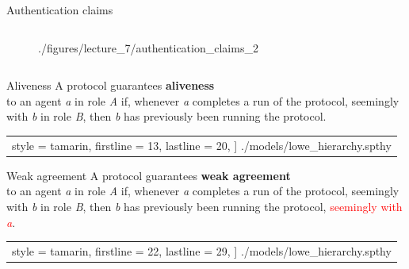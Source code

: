 \documentclass[11pt,aspectratio=169]{beamer}
\begin{document}
\begin{frame}[fragile]{Authentication claims}
\begin{columns}[T]
\begin{column}{.35\textwidth}
\begin{figure}
                    {./figures/lecture_7/authentication_claims_2}
            \end{figure}
        \end{column}
    \end{columns}
\end{frame}

\begin{frame}[fragile,t]{Aliveness}
    A protocol guarantees \textbf{aliveness}\\ to an agent \textit{a} in role 
    \textit{A} if, whenever \textit{a} completes a run of the protocol, 
    seemingly with \textit{b} in role \textit{B}, then \textit{b} has 
    previously been running the protocol.
    \vfill
    \begin{center}
        \begin{tabular}{c}
            
                style = tamarin,
                firstline = 13,
                lastline  = 20,
            ] {./models/lowe_hierarchy.spthy}
        \end{tabular}
    \end{center}
\end{frame}

\begin{frame}[fragile,t]{Weak agreement}
    A protocol guarantees \textbf{weak agreement}\\ to an agent \textit{a} in 
    role \textit{A} if, whenever \textit{a} completes a run of the protocol, 
    seemingly with \textit{b} in role \textit{B}, then \textit{b} has 
    previously been running the protocol, \textcolor{red}{seemingly with
    \textit{a}}.
    \vfill
    \begin{center}
        \begin{tabular}{c}
            
                style = tamarin,
                firstline = 22,
                lastline  = 29,
            ] {./models/lowe_hierarchy.spthy}
        \end{tabular}
    \end{center}
\end{frame}
\end{document}
